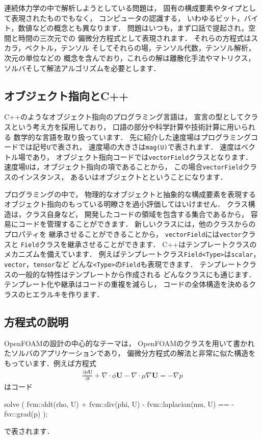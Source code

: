 連続体力学の中で解析しようとしている問題は，
固有の構成要素やタイプとして表現されたものでもなく，
コンピュータの認識する，
いわゆるビット，バイト，数値などの概念とも異なります．
問題はいつも，まず口話で提起され，空間と時間の三次元での
偏微分方程式として表現されます．
それらの方程式はスカラ，ベクトル，テンソル
そしてそれらの場，テンソル代数，テンソル解析，次元の単位などの
概念を含んでおり，これらの解は離散化手法やマトリクス，
ソルバそして解法アルゴリズムを必要とします．


\subsection{オブジェクト指向とC++}
\label{ssec:3.1.2}
C++のようなオブジェクト指向のプログラミング言語は，
宣言の型としてクラスという考え方を採用しており，
口語の部分や科学計算や技術計算に用いられる
数学的な言語を取り扱っています．
先に紹介した速度場はプログラミングコードでは記号\texttt{U}で表され，
速度場の大きさは\texttt{mag(U)}で表されます．
速度はベクトル場であり，
オブジェクト指向コードでは\texttt{vectorField}クラスとなります．
速度場\texttt{U}は，オブジェクト指向の項であることから，
この場合\texttt{vectorField}クラスのインスタンス，
あるいはオブジェクトとということになります．

プログラミングの中で，
物理的なオブジェクトと抽象的な構成要素を表現する
オブジェクト指向のもっている明瞭さを過小評価してはいけません．
クラス構造は，クラス自身など，
開発したコードの領域を包含する集合であるから，
容易にコードを管理することができます．
新しいクラスには，他のクラスからのプロパティを
継承させることができることから，
\texttt{vectorField}には\texttt{vector}クラスと
\texttt{Field}クラスを継承させることができます．
C++はテンプレートクラスのメカニズムを備えています．
例えばテンプレートクラス\texttt{Field<Type>}は\texttt{scalar}，
\texttt{vector}，\texttt{tensor}など
どんな\texttt{<Type>}の\texttt{Field}も表現できます．
テンプレートクラスの一般的な特性はテンプレートから作成される
どんなクラスにも通じます．
テンプレート化や継承はコードの重複を減らし，
コードの全体構造を決めるクラスのヒエラルキを作ります．


\subsection{方程式の説明}
\label{ssec:3.1.3}
OpenFOAMの設計の中心的なテーマは，
OpenFOAMのクラスを用いて書かれたソルバのアプリケーションであり，
偏微分方程式の解法と非常に似た構造をもっています．例えば方程式
\begin{align*}
 \frac{\partial\rho\bm{U}}{\partial t} + \nabla \cdot \phi\bm{U}
 - \nabla \cdot \mu\nabla\bm{U} = -\nabla p
\end{align*}
はコード
\begin{OFverbatim}[file]
solve
(
    fvm::ddt(rho, U)
  + fvm::div(phi, U)
  - fvm::laplacian(mu, U)
    ==
  - fvc::grad(p)
);
\end{OFverbatim}
で表されます．

